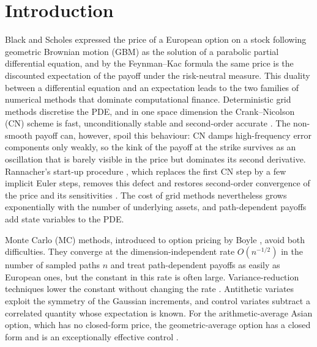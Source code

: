 \documentclass[11pt,a4paper]{article}
\begin{document}
\section{Introduction}\label{sec:intro}

Black and Scholes \citep{black1973} expressed the price of a European option on a stock following geometric Brownian motion (GBM) as the solution of a parabolic partial differential equation, and by the Feynman--Kac formula the same price is the discounted expectation of the payoff under the risk-neutral measure.
This duality between a differential equation and an expectation leads to the two families of numerical methods that dominate computational finance.
Deterministic grid methods discretise the PDE, and in one space dimension the Crank--Nicolson (CN) scheme \citep{crank1947} is fast, unconditionally stable and second-order accurate \citep{duffy2006,wilmott1995}.
The non-smooth payoff can, however, spoil this behaviour: CN damps high-frequency error components only weakly, so the kink of the payoff at the strike survives as an oscillation that is barely visible in the price but dominates its second derivative.
Rannacher's start-up procedure \citep{rannacher1984}, which replaces the first CN step by a few implicit Euler steps, removes this defect and restores second-order convergence of the price and its sensitivities \citep{giles2006,pooley2003}.
The cost of grid methods nevertheless grows exponentially with the number of underlying assets, and path-dependent payoffs add state variables to the PDE.

Monte Carlo (MC) methods, introduced to option pricing by Boyle \citep{boyle1977}, avoid both difficulties.
They converge at the dimension-independent rate $O(n^{-1/2})$ in the number of sampled paths $n$ and treat path-dependent payoffs as easily as European ones, but the constant in this rate is often large.
Variance-reduction techniques lower the constant without changing the rate \citep{glasserman2004,hammersley1964}.
Antithetic variates exploit the symmetry of the Gaussian increments, and control variates \citep{lavenberg1981} subtract a correlated quantity whose expectation is known.
For the arithmetic-average Asian option, which has no closed-form price, the geometric-average option has a closed form and is an exceptionally effective control \citep{kemna1990}.
\end{document}
